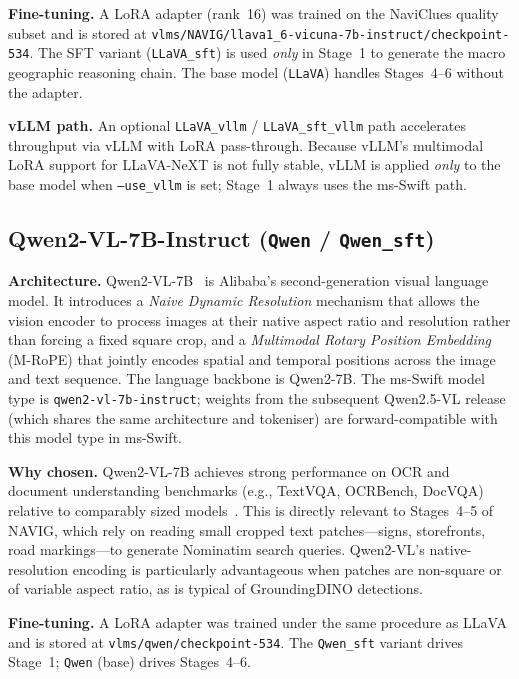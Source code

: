 \documentclass[11pt]{article}
\begin{document}
\textbf{Fine-tuning.} A LoRA adapter (rank~16) was trained on the NaviClues quality subset
and is stored at \texttt{vlms/NAVIG/llava1\_6-vicuna-7b-instruct/checkpoint-534}. The SFT
variant (\texttt{LLaVA\_sft}) is used \emph{only} in Stage~1 to generate the macro
geographic reasoning chain. The base model (\texttt{LLaVA}) handles Stages~4--6 without the
adapter.

\textbf{vLLM path.} An optional \texttt{LLaVA\_vllm} / \texttt{LLaVA\_sft\_vllm} path
accelerates throughput via vLLM with LoRA pass-through. Because vLLM's multimodal LoRA
support for LLaVA-NeXT is not fully stable, vLLM is applied \emph{only} to the base model
when \texttt{--use\_vllm} is set; Stage~1 always uses the ms-Swift path.

\subsection{Qwen2-VL-7B-Instruct (\texttt{Qwen} / \texttt{Qwen\_sft})}

\textbf{Architecture.} Qwen2-VL-7B~\citep{Wang2024Qwen2VL} is Alibaba's second-generation
visual language model. It introduces a \emph{Naive Dynamic Resolution} mechanism that allows
the vision encoder to process images at their native aspect ratio and resolution rather than
forcing a fixed square crop, and a \emph{Multimodal Rotary Position Embedding} (M-RoPE)
that jointly encodes spatial and temporal positions across the image and text sequence. The
language backbone is Qwen2-7B. The ms-Swift model type is \texttt{qwen2-vl-7b-instruct};
weights from the subsequent Qwen2.5-VL release (which shares the same architecture and
tokeniser) are forward-compatible with this model type in ms-Swift.

\textbf{Why chosen.} Qwen2-VL-7B achieves strong performance on OCR and document
understanding benchmarks (e.g., TextVQA, OCRBench, DocVQA) relative to comparably sized
models~\citep{Wang2024Qwen2VL}. This is directly relevant to Stages~4--5 of NAVIG, which
rely on reading small cropped text patches---signs, storefronts, road markings---to generate
Nominatim search queries. Qwen2-VL's native-resolution encoding is particularly advantageous
when patches are non-square or of variable aspect ratio, as is typical of GroundingDINO
detections.

\textbf{Fine-tuning.} A LoRA adapter was trained under the same procedure as LLaVA and is
stored at \texttt{vlms/qwen/checkpoint-534}. The \texttt{Qwen\_sft} variant drives Stage~1;
\texttt{Qwen} (base) drives Stages~4--6.
\end{document}
